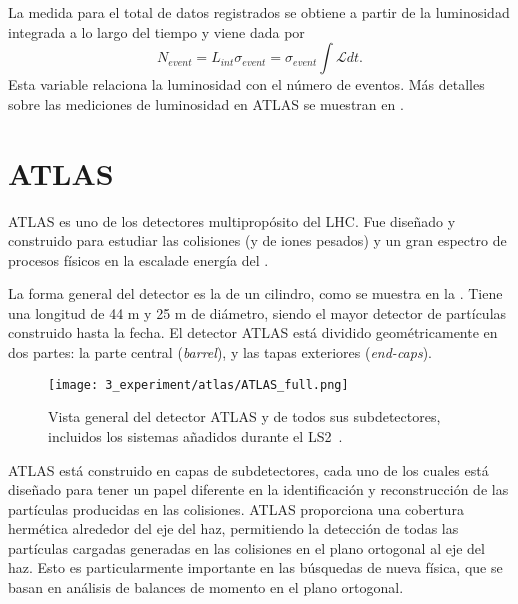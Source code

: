 La medida para el total de datos registrados se obtiene a partir de la luminosidad integrada a lo largo del tiempo y viene dada por
\begin{equation}
    N_{event} = L_{int} \sigma_{event} = \sigma_{event} \int \mathcal{L} dt.
    \label{eq:atlas:LHC:integrated_lumi}
\end{equation}
Esta variable relaciona la luminosidad con el número de eventos. Más detalles sobre las mediciones de luminosidad en \ac{ATLAS} se muestran en \Sect{\ref{sec:atlas:runs}}.








\FloatBarrier
\section{ATLAS}
\label{sec:atlas:atlas}

\ac{ATLAS} es uno de los detectores multipropósito del \ac{LHC}. Fue diseñado y construido para estudiar las colisiones \pp (y de iones pesados) y un gran espectro de procesos físicos en la escalade energía del \tev.

La forma general del detector es la de un cilindro, como se muestra en la \Fig{\ref{fig:atlas:atlas:atlas}}. Tiene una longitud de 44 m y 25 m de diámetro, siendo el mayor detector de partículas construido hasta la fecha. El detector \ac{ATLAS} está dividido geométricamente en dos partes: la parte central (\textit{barrel}), y las tapas exteriores (\textit{end-caps}).

\begin{figure}[ht!]
    \centering
    \texttt{[image: 3\_experiment/atlas/ATLAS\_full.png]}
    \caption{Vista general del detector \ac{ATLAS} y de todos sus subdetectores, incluidos los sistemas añadidos durante el \ac{LS2}~\cite{ATLAS-Diagram}.}
    \label{fig:atlas:atlas:atlas}
\end{figure}

\ac{ATLAS} está construido en capas de subdetectores, cada uno de los cuales está diseñado para tener un papel diferente en la identificación y reconstrucción de las partículas producidas en las colisiones. \ac{ATLAS} proporciona una cobertura hermética alrededor del eje del haz, permitiendo la detección de todas las partículas cargadas generadas en las colisiones en el plano ortogonal al eje del haz. Esto es particularmente importante en las búsquedas de nueva física, que se basan en análisis de balances de momento en el plano ortogonal.

